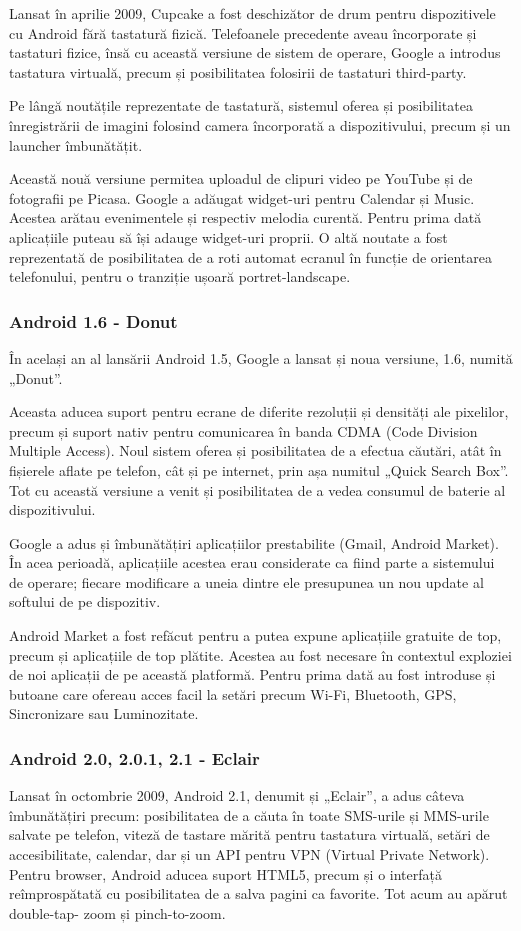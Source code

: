 \documentclass[12pt,a4paper]{article}
\begin{document}
	Lansat în aprilie 2009, Cupcake a fost deschizător de drum pentru dispozitivele cu Android fără tastatură fizică. Telefoanele precedente aveau încorporate și tastaturi fizice, însă cu această versiune de sistem de operare, Google a introdus tastatura virtuală, precum și posibilitatea folosirii de tastaturi third-party. 

	Pe lângă noutățile reprezentate de tastatură, sistemul oferea și posibilitatea înregistrării de imagini folosind camera încorporată a dispozitivului, precum și un launcher îmbunătățit.

	Această nouă versiune permitea uploadul de clipuri video pe YouTube și de fotografii pe Picasa. Google a adăugat widget-uri pentru Calendar și Music. Acestea arătau evenimentele și respectiv melodia curentă. Pentru prima dată aplicațiile puteau să își adauge widget-uri proprii. O altă noutate a fost reprezentată de posibilitatea de a roti automat ecranul în funcție de orientarea telefonului, pentru o tranziție ușoară portret-landscape.


\subsubsection{Android 1.6 - Donut}
În același an al lansării Android 1.5, Google a lansat și noua versiune, 1.6, numită „Donut”.
	
	Aceasta aducea suport pentru ecrane de diferite rezoluții și densități ale pixelilor, precum și suport nativ pentru comunicarea în banda CDMA (Code Division Multiple Access). Noul sistem oferea și posibilitatea de a efectua căutări, atât în fișierele aflate pe telefon, cât și pe internet, prin așa numitul „Quick Search Box”. Tot cu această versiune a venit și posibilitatea de a vedea consumul de baterie al dispozitivului.

	Google a adus și îmbunătățiri aplicațiilor prestabilite (Gmail, Android Market). În acea perioadă, aplicațiile acestea erau considerate ca fiind parte a sistemului de operare; fiecare modificare a uneia dintre ele presupunea un nou update al softului de pe dispozitiv.
	
	Android Market a fost refăcut pentru a putea expune aplicațiile gratuite de top, precum și aplicațiile de top plătite. Acestea au fost necesare în contextul exploziei de noi aplicații de pe această platformă. Pentru prima dată au fost introduse și butoane care ofereau acces facil la setări precum Wi-Fi, Bluetooth, GPS, Sincronizare sau Luminozitate.


\subsubsection{Android 2.0, 2.0.1, 2.1 - Eclair}
Lansat în octombrie 2009, Android 2.1, denumit și „Eclair”, a adus câteva îmbunătățiri precum: posibilitatea de a căuta în toate SMS-urile și MMS-urile salvate pe telefon, viteză de tastare mărită pentru tastatura virtuală, setări de accesibilitate, calendar, dar și un API pentru VPN (Virtual Private Network). Pentru browser, Android aducea suport HTML5, precum și o interfață reîmprospătată cu posibilitatea de a salva pagini ca favorite. Tot acum au apărut double-tap- zoom și pinch-to-zoom.
	
\end{document}
